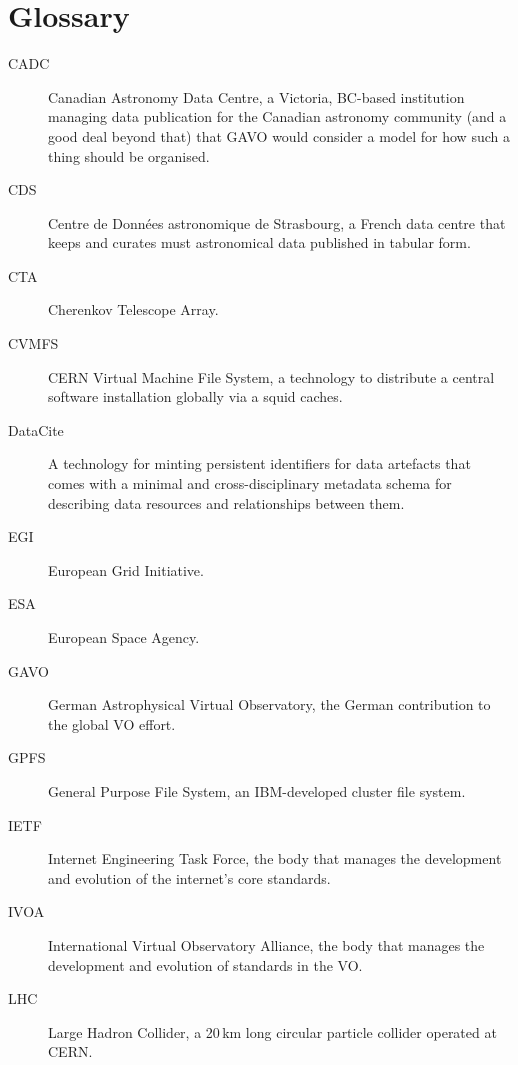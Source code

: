 \section{Glossary}
\label{app:glossary}

\begin{description}
\item[CADC] Canadian Astronomy Data Centre, a Victoria, BC-based
institution managing data publication for the Canadian astronomy
community (and a good deal beyond that) that GAVO would consider a model
for how such a thing should be organised.

\item[CDS] Centre de Donn\'ees astronomique de Strasbourg, a French data
centre that keeps and curates must astronomical data published in
tabular form.

\item[CTA] Cherenkov Telescope Array.

\item[CVMFS] CERN Virtual Machine File System, a technology to distribute a central software installation globally via a squid caches.

\item[DataCite] A technology for minting persistent identifiers for data
artefacts that comes with a minimal and cross-disciplinary metadata
schema for describing data resources and relationships between them.

\item[EGI] European Grid Initiative.

\item[ESA] European Space Agency.

\item[GAVO] German Astrophysical Virtual Observatory, the German
contribution to the global VO effort.

\item[GPFS] General Purpose File System, an IBM-developed cluster file
system.

\item[IETF] Internet Engineering Task Force, the body that manages the
development and evolution of the internet's core standards.

\item[IVOA] International Virtual Observatory Alliance, the body that
manages the development and evolution of standards in the VO.

\item[LHC] Large Hadron Collider, a 20\,km long circular particle collider operated at CERN.
 

\end{description}
